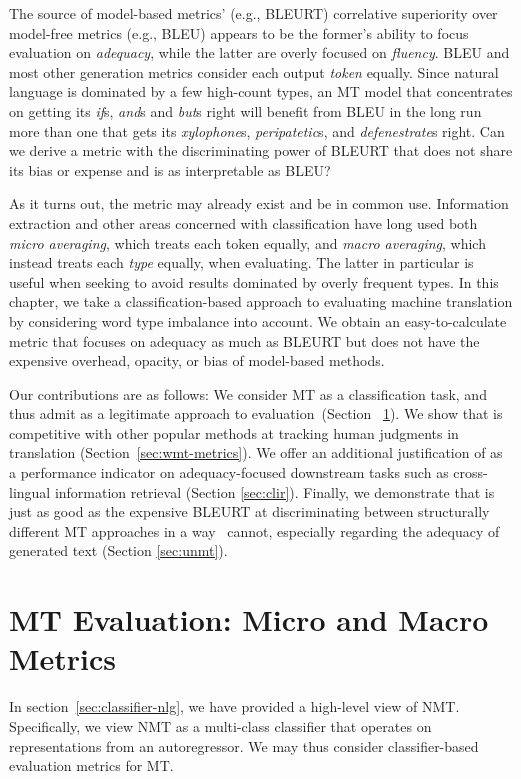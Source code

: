 The source of model-based metrics' (e.g., BLEURT) correlative superiority over model-free metrics (e.g., BLEU) appears to be the former's ability to focus evaluation on \textit{adequacy}, while the latter are overly focused on \textit{fluency}. BLEU and most other generation metrics consider each output \textit{token} equally. Since natural language is dominated by a few high-count types, an MT model that concentrates on getting its \textit{if}s, \textit{and}s and \textit{but}s right will benefit from BLEU in the long run more than one that gets its \textit{xylophone}s, \textit{peripatetic}s, and \textit{defenestrate}s right. Can we derive a metric with the discriminating power of BLEURT that does not share its bias or expense and is as interpretable as BLEU? 

As it turns out, the metric may already exist and be in common use. Information extraction and other areas concerned with classification have long used both \textit{micro averaging}, which treats each token equally, and \textit{macro averaging}, which instead treats each \textit{type} equally, when evaluating. The latter in particular is useful when seeking to avoid results dominated by overly frequent types. In this chapter, we take a classification-based approach to evaluating machine translation by considering word type imbalance into account. We obtain an easy-to-calculate metric that focuses on adequacy as much as BLEURT but does not have the expensive overhead, opacity, or bias of model-based methods. 


Our contributions are as follows:
We consider MT as a classification task, and thus admit  as a legitimate approach to evaluation~(Section ~\ref{sec:mt-as-cls}). 
We show that  is competitive with other popular methods at tracking human judgments in translation (Section~\ref{sec:wmt-metrics}). 
We offer an additional justification of  as a performance indicator on adequacy-focused downstream tasks such as cross-lingual information retrieval (Section \ref{sec:clir}). 
Finally, we demonstrate that  is just as good as the expensive BLEURT at discriminating between structurally different MT approaches in a way \bleu\ cannot, especially regarding the adequacy of generated text (Section \ref{sec:unmt}).


\section{MT Evaluation: Micro and Macro Metrics}
\label{sec:mt-as-cls}
In section~\ref{sec:classifier-nlg}, we have provided a high-level view of NMT. 
Specifically, we view NMT as a multi-class classifier that operates on representations from an autoregressor.
We may thus consider classifier-based evaluation metrics for MT.  


